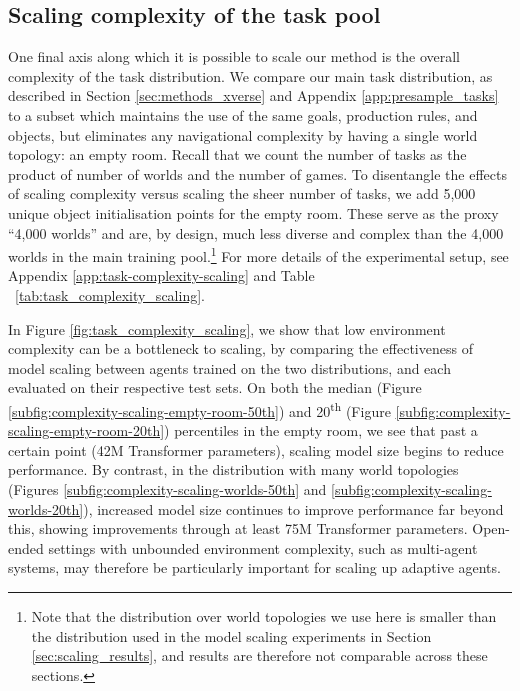 

\subsection{Scaling complexity of the task pool}
\label{app:scaling_complexity}

One final axis along which it is possible to scale our method is the overall complexity of the task distribution. We compare our main task distribution, as described in Section \ref{sec:methods_xverse} and Appendix \ref{app:presample_tasks} to a subset which maintains the use of the same goals, production rules, and objects, but eliminates any navigational complexity by having a single world topology: an empty room. Recall that we count the number of tasks as the product of number of worlds and the number of games. To disentangle the effects of scaling complexity versus scaling the sheer number of tasks, we add 5,000 unique object initialisation points for the empty room. These serve as the proxy ``4,000 worlds'' and are, by design, much less diverse and complex than the 4,000 worlds in the main training pool.\footnote{Note that the distribution over world topologies we use here is smaller than the distribution used in the model scaling experiments in Section \ref{sec:scaling_results}, and results are therefore not comparable across these sections.} For more details of the experimental setup, see Appendix \ref{app:task-complexity-scaling} and Table ~\ref{tab:task_complexity_scaling}.

In Figure \ref{fig:task_complexity_scaling}, we show that low environment complexity can be a bottleneck to scaling, by comparing the effectiveness of model scaling between agents trained on the two distributions, and each evaluated on their respective test sets. On both the median (Figure \ref{subfig:complexity-scaling-empty-room-50th}) and 20\textsuperscript{th} (Figure \ref{subfig:complexity-scaling-empty-room-20th}) percentiles in the empty room, we see that past a certain point (42M Transformer parameters), scaling model size begins to reduce performance. By contrast, in the distribution with many world topologies (Figures \ref{subfig:complexity-scaling-worlds-50th} and \ref{subfig:complexity-scaling-worlds-20th}), increased model size continues to improve performance far beyond this, showing improvements through at least 75M Transformer parameters.
Open-ended settings with unbounded environment complexity, such as multi-agent systems, may therefore be particularly important for scaling up adaptive agents.


